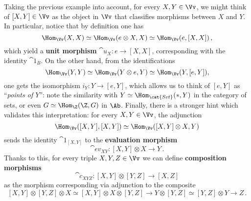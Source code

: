 \begin{rmk!}\label{v-morphisms}
    Taking the previous example into account, for every $X,Y \in \Vv$,
    we might think of $[X,Y] \in \Vv$ as the object in $\Vv$
    that classifies morphisms between $X$ and $Y$.
    In particular, notice that by definition one has
    \begin{equation*}
        \Hom_{\Vv}(X,X) \simeq \Hom_{\Vv}(e \otimes X,X) \simeq \Hom_{\Vv}(e,[X,X])\,,
    \end{equation*}
    which yield a \textbf{unit morphism} $\cat{u}_{X}:e \to [X,X]$, 
    corresponding with the identity $\cat{1}_{B}$.
    On the other hand, from the identifications
    \begin{equation*}
        \Hom_{\Vv}(Y,Y) \simeq \Hom_{\Vv}(Y \otimes e, Y) \simeq \Hom_{\Vv}(Y,[e,Y]),
    \end{equation*}
    one gets the isomorphism $i_{Y}:Y \to [e,Y]$, 
    which allows us to think of $[e,Y]$ as ``\emph{points of $Y$}'':
    note the similarity with $Y \simeq \Hom_{\cat{Set}}(\ast,Y)$ 
    in the category of sets, or even $G \simeq \Hom_{\Z}(\Z,G)$
    in $\Ab$. Finally, there is a stronger hint which validates
    this interpretation: for every $X,Y \in \Vv$, the adjunction
    \begin{equation*}
        \Hom_{\Vv}([X,Y], [X,Y]) \simeq \Hom_{\Vv}([X,Y] \otimes X, Y)
    \end{equation*}
    sends the identity $\cat{1}_{[X,Y]}$ 
    to the \textbf{evaluation morphism}
    \begin{equation*}
        \cat{ev}_{XY} : [X,Y] \otimes X \longrightarrow Y\,.
    \end{equation*}
    Thanks to this, for every triple $X,Y,Z \in \Vv$
    we can define \textbf{composition morphisms}
    \begin{equation*}
        \cat{c}_{XYZ} : [X,Y] \otimes [Y,Z] \longrightarrow [X,Z]
    \end{equation*}
    as the morphism corresponding via adjunction
    to the composite
    \begin{equation*}
            {[X,Y] \otimes [Y,Z] \otimes X} 
            \simeq {[X,Y] \otimes X \otimes [Y,Z]} 
            \to {Y \otimes [Y,Z]}
            \simeq {[Y,Z] \otimes Y}
            \to Z\,.
    \end{equation*}
\end{rmk!}

